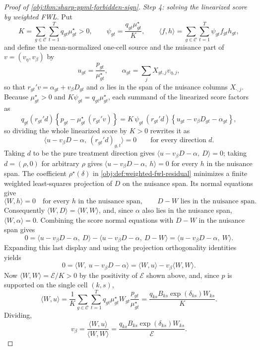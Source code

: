 \begin{proof}[Proof of \cref{obj:thm:sharp-ppml-forbidden-sign}]
\textit{Step 4: solving the linearized score by weighted FWL.} Put
\[
K=\sum_{g\in\mathcal C}\sum_{t=1}^T q_{gt}\mu^\star_{gt}>0,
\qquad
\psi_{gt}=\frac{q_{gt}\mu^\star_{gt}}{K},
\qquad
\langle f,h\rangle=\sum_{g\in\mathcal C}\sum_{t=1}^T\psi_{gt}f_{gt}h_{gt},
\]
and define the mean-normalized one-cell source and the nuisance part of \(v=(v_\eta,v_\beta)\) by
\[
u_{gt}=\frac{p_{gt}}{\mu^\star_{gt}},
\qquad
\alpha_{gt}=\sum_jX_{gt,j}v_{\eta,j},
\]
so that \(r_{gt}'v=\alpha_{gt}+v_\beta D_{gt}\) and \(\alpha\) lies in the span of the nuisance columns \(X_{\cdot,j}\). Because \(\mu^\star_{gt}>0\) and \(K\psi_{gt}=q_{gt}\mu^\star_{gt}\), each summand of the linearized score factors as
\[
q_{gt}(r_{gt}'d)\left\{p_{gt}-\mu^\star_{gt}\,(r_{gt}'v)\right\}
=
K\,\psi_{gt}\,(r_{gt}'d)\left\{u_{gt}-v_\beta D_{gt}-\alpha_{gt}\right\},
\]
so dividing the whole linearized score by \(K>0\) rewrites it as
\[
\langle u-v_\beta D-\alpha,\ (r_{gt}'d)_{g,t}\rangle=0
\qquad\text{for every direction }d .
\]
Taking \(d\) to be the pure treatment direction gives \(\langle u-v_\beta D-\alpha,\ D\rangle=0\); taking \(d=(\rho,0)\) for arbitrary \(\rho\) gives \(\langle u-v_\beta D-\alpha,\ h\rangle=0\) for every \(h\) in the nuisance span.
The coefficient \(\rho^\star(\delta)\) in \cref{obj:def:weighted-fwl-residual} minimizes a finite weighted least-squares projection of \(D\) on the nuisance span. Its normal equations give
\[
\langle W,h\rangle=0\quad\text{for every }h\text{ in the nuisance span},
\qquad
D-W\text{ lies in the nuisance span}.
\]
Consequently \(\langle W,D\rangle=\langle W,W\rangle\), and, since \(\alpha\) also lies in the nuisance span, \(\langle W,\alpha\rangle=0\). Combining the score normal equations with \(D-W\) in the nuisance span gives
\[
0=\langle u-v_\beta D-\alpha,\ D\rangle
 -\langle u-v_\beta D-\alpha,\ D-W\rangle
=\langle u-v_\beta D-\alpha,\ W\rangle.
\]
Expanding this last display and using the projection orthogonality identities yields
\[
0=\langle W,\ u-v_\beta D-\alpha\rangle
=\langle W,u\rangle-v_\beta\langle W,W\rangle .
\]
Now \(\langle W,W\rangle=\mathcal E/K>0\) by the positivity of \(\mathcal E\) shown above, and, since \(p\) is supported on the single cell \((k,s)\),
\[
\langle W,u\rangle
=
\frac{1}{K}\sum_{g\in\mathcal C}\sum_{t=1}^T q_{gt}\mu^\star_{gt}W_{gt}\frac{p_{gt}}{\mu^\star_{gt}}
=
\frac{q_{ks}B_{ks}\exp(\delta_{ks})W_{ks}}{K}.
\]
Dividing,
\[
v_\beta=\frac{\langle W,u\rangle}{\langle W,W\rangle}
=\frac{q_{ks}B_{ks}\exp(\delta_{ks})W_{ks}}{\mathcal E}.
\]


\end{proof}
